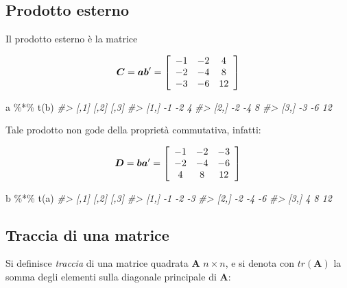 \documentclass[
  11pt,
]{krantz}
\makeatletter
\newenvironment{Shaded}{\begin{snugshade}}{\end{snugshade}}
\newcommand{\CommentTok}[1]{\textcolor[rgb]{0.37,0.37,0.37}{\textit{#1}}}
\newcommand{\FunctionTok}[1]{\textcolor[rgb]{0,0,0}{#1}}
\newcommand{\NormalTok}[1]{#1}
\newcommand{\SpecialCharTok}[1]{\textcolor[rgb]{0,0,0}{#1}}
\newenvironment{kframe}{%
\medskip{}
\setlength{\fboxsep}{.8em}
 \def\at@end@of@kframe{}%
 \ifinner\ifhmode%
  \def\at@end@of@kframe{\end{minipage}}%
  \begin{minipage}{\columnwidth}%
 \fi\fi%
 \def\FrameCommand##1{\hskip\@totalleftmargin \hskip-\fboxsep
 \colorbox{shadecolor}{##1}\hskip-\fboxsep
     \hskip-\linewidth \hskip-\@totalleftmargin \hskip\columnwidth}%
 \MakeFramed {\advance\hsize-\width
   \@totalleftmargin\z@ \linewidth\hsize
   \@setminipage}}%
 {\par\unskip\endMakeFramed%
 \at@end@of@kframe}
\renewenvironment{Shaded}{\begin{kframe}}{\end{kframe}}
\theoremstyle{definition}
\theoremstyle{definition}
\theoremstyle{definition}
\theoremstyle{definition}
\theoremstyle{remark}
\makeatother
\begin{document}
\hypertarget{prodotto-esterno}{%
\subsection{Prodotto esterno}\label{prodotto-esterno}}

Il prodotto esterno è la matrice

\[
\boldsymbol{C} = \boldsymbol{a}\boldsymbol{b}'= \left[
\begin{array}{c c c}
-1 & -2 & 4\\
-2 & -4 & 8\\
-3 & -6 & 12
\end{array}
 \right]
 \]

\begin{Shaded}
\begin{Highlighting}[]
\NormalTok{a }\SpecialCharTok{\%*\%} \FunctionTok{t}\NormalTok{(b)}
\CommentTok{\#\textgreater{}      [,1] [,2] [,3]}
\CommentTok{\#\textgreater{} [1,]   {-}1   {-}2    4}
\CommentTok{\#\textgreater{} [2,]   {-}2   {-}4    8}
\CommentTok{\#\textgreater{} [3,]   {-}3   {-}6   12}
\end{Highlighting}
\end{Shaded}

Tale prodotto non gode della proprietà commutativa, infatti:

\[
\boldsymbol{D} = \boldsymbol{b}\boldsymbol{a}'= \left[
\begin{array}{c c c}
-1 & -2 & -3\\
-2 & -4 & -6\\
4 & 8 & 12
\end{array}
 \right]
\]

\begin{Shaded}
\begin{Highlighting}[]
\NormalTok{b }\SpecialCharTok{\%*\%} \FunctionTok{t}\NormalTok{(a)}
\CommentTok{\#\textgreater{}      [,1] [,2] [,3]}
\CommentTok{\#\textgreater{} [1,]   {-}1   {-}2   {-}3}
\CommentTok{\#\textgreater{} [2,]   {-}2   {-}4   {-}6}
\CommentTok{\#\textgreater{} [3,]    4    8   12}
\end{Highlighting}
\end{Shaded}

\hypertarget{traccia-di-una-matrice}{%
\subsection{Traccia di una matrice}\label{traccia-di-una-matrice}}

Si definisce \emph{traccia} di una matrice quadrata \(\boldsymbol{A}\) \(n \times n\), e si denota con \(tr(\boldsymbol{A})\) la somma degli elementi sulla diagonale principale di \(\boldsymbol{A}\):
\end{document}
